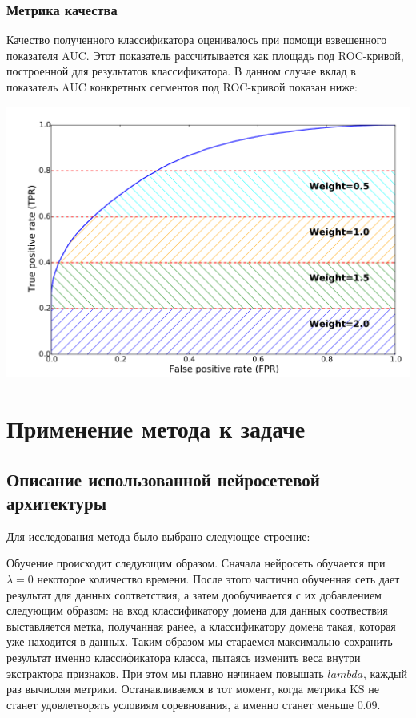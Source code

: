 \documentclass[14pt]{extarticle}
\begin{document}
\subsubsection{Метрика качества}
Качество полученного классификатора оценивалось при помощи взвешенного показателя AUC. Этот показатель рассчитывается как площадь под ROC-кривой, построенной для результатов классификатора. В данном случае вклад в показатель AUC конкретных сегментов под ROC-кривой показан ниже:

\begin{center}
	\includegraphics[scale=0.8]{auc.png}
\end{center}

\newpage
\section{Применение метода к задаче}

\subsection{Описание использованной нейросетевой архитектуры}

Для исследования метода было выбрано следующее строение: %


Обучение происходит следующим образом.
Сначала нейросеть обучается при $\lambda = 0$ некоторое количество времени. После этого частично обученная сеть дает результат для данных соответствия, а затем дообучивается с их добавлением следующим образом: на вход классификатору домена для данных соотвествия выставляется метка, получанная ранее, а классификатору домена такая, которая уже находится в данных. Таким образом мы стараемся максимально сохранить результат именно классификатора класса, пытаясь изменить веса внутри экстрактора признаков. При этом мы плавно начинаем повышать $lambda$, каждый раз вычисляя метрики. Останавливаемся в тот момент, когда метрика KS не станет удовлетворять условиям соревнования, а именно станет меньше $0.09$. 
\end{document}
